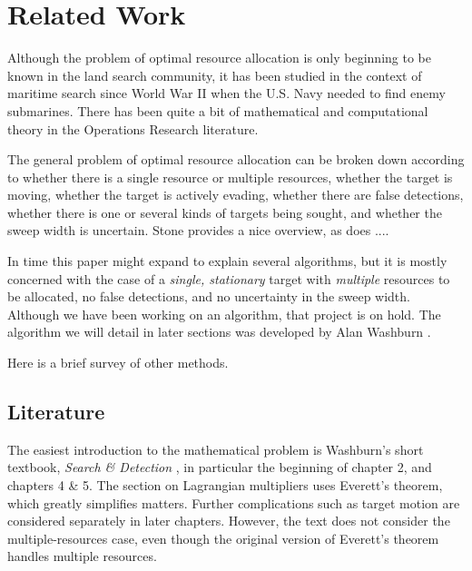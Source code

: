 
\section{Related Work}
\label{sec:related}

Although the problem of optimal resource allocation is only beginning
to be known in the land search community, it has been studied in the
context of maritime search since World War II when the U.S. Navy
needed to find enemy submarines. There has been quite a bit of
mathematical and computational theory in the Operations Research
literature. 

The general problem of optimal resource allocation can be broken down
according to whether there is a single resource or multiple resources,
whether the target is moving, whether the target is actively evading,
whether there are false detections, whether there is one or several
kinds of targets being sought, and whether the sweep width is
uncertain. Stone \cite{} provides a nice overview, as does ....

In time this paper might expand to explain several algorithms, but it
is mostly concerned with the case of a \emph{single,
  stationary} target with \emph{multiple} resources to be allocated,
no false detections, and no uncertainty in the sweep width. Although
we have been working on an algorithm, that project is on hold. The
algorithm we will detail in later sections was developed by Alan Washburn
\cite{washburn:_jota}. 

Here is a brief survey of other methods.

\subsection{Literature}
The easiest introduction to the mathematical problem is Washburn's
short textbook, \emph{Search \& Detection} \cite{}, in particular the
beginning of chapter 2, and chapters 4 \& 5. The section on Lagrangian
multipliers uses Everett's theorem, which greatly simplifies
matters. Further complications such as target motion are
considered separately in later chapters. However, the text does not
consider the multiple-resources case, even though the original version
of Everett's theorem \cite{} handles multiple resources.

